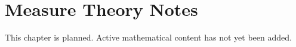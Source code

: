 
\section*{Measure Theory Notes}
This chapter is planned. Active mathematical content has not yet been added.
